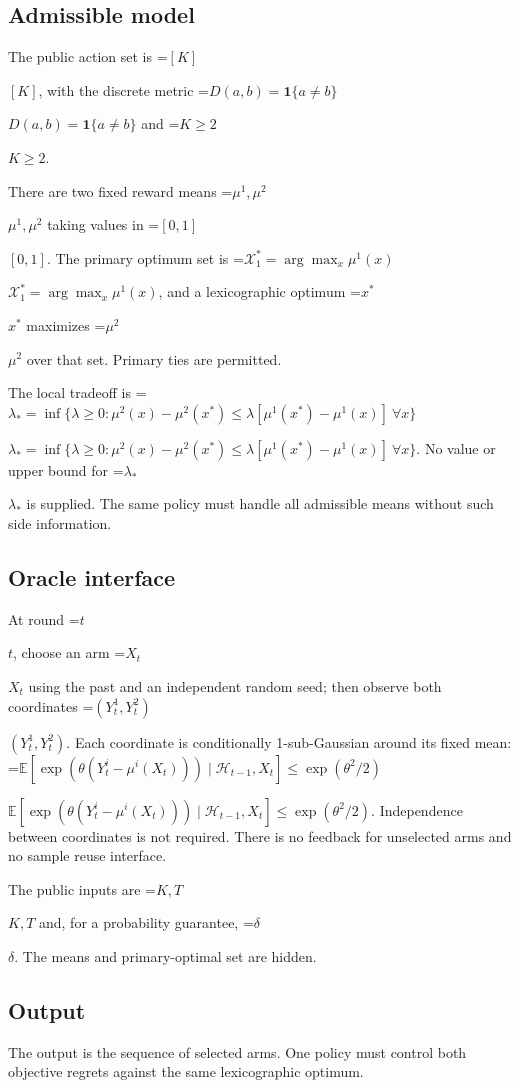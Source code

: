 \documentclass[10pt,a4paper]{article}
\newcommand{\AtlasMath}[1]{\par\begingroup\centering\setbox0=\hbox{$\displaystyle #1$}\ifdim\wd0>1.4\linewidth\typeout{ATLAS WIDE FORMULA: \the\wd0}\fi\ifdim\wd0>\linewidth\resizebox{\linewidth}{!}{\box0}\else\box0\fi\par\endgroup}
\newcommand{\AtlasInlineMath}[1]{\begingroup\setbox0=\hbox{$#1$}\ifdim\wd0>.4\linewidth\endgroup\AtlasMath{#1}\else\endgroup$#1$\fi}
\begin{document}
\subsection{Admissible model}


The public action set is \AtlasInlineMath{[K]}, with the discrete metric \AtlasInlineMath{D(a,b)=\mathbf1\{a\ne b\}} and \AtlasInlineMath{K\ge2}.



There are two fixed reward means \AtlasInlineMath{\mu^1,\mu^2} taking values in \AtlasInlineMath{[0,1]}. The primary optimum set is \AtlasInlineMath{\mathcal X_1^*=\arg\max_x\mu^1(x)}, and a lexicographic optimum \AtlasInlineMath{x^*} maximizes \AtlasInlineMath{\mu^2} over that set. Primary ties are permitted.



The local tradeoff is \AtlasInlineMath{\lambda_* =\inf\{\lambda\ge0:\mu^2(x)-\mu^2(x^*)\le\lambda[\mu^1(x^*)-\mu^1(x)]\ \forall x\}}. No value or upper bound for \AtlasInlineMath{\lambda_*} is supplied. The same policy must handle all admissible means without such side information.



\subsection{Oracle interface}


At round \AtlasInlineMath{t}, choose an arm \AtlasInlineMath{X_t} using the past and an independent random seed; then observe both coordinates \AtlasInlineMath{(Y_t^1,Y_t^2)}. Each coordinate is conditionally 1-sub-Gaussian around its fixed mean: \AtlasInlineMath{\mathbb E[\exp(\theta(Y_t^i-\mu^i(X_t)))\mid\mathcal H_{t-1},X_t]\le\exp(\theta^2/2)}. Independence between coordinates is not required. There is no feedback for unselected arms and no sample reuse interface.



The public inputs are \AtlasInlineMath{K,T} and, for a probability guarantee, \AtlasInlineMath{\delta}. The means and primary-optimal set are hidden.



\subsection{Output}


The output is the sequence of selected arms. One policy must control both objective regrets against the same lexicographic optimum.
\end{document}
